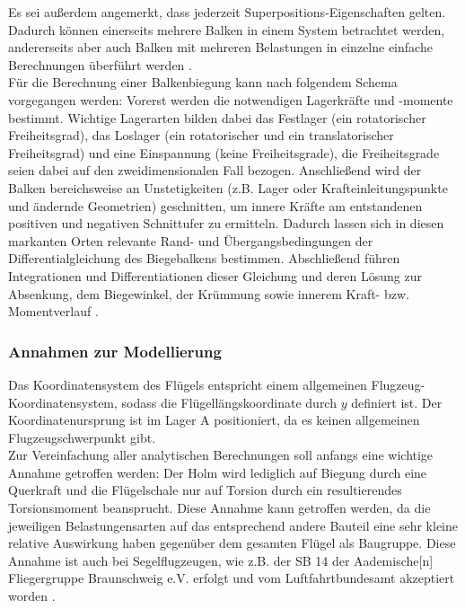 \noindent Es sei außerdem angemerkt, dass jederzeit Superpositions-Eigenschaften gelten. Dadurch können einerseits mehrere Balken in einem System betrachtet werden, andererseits aber auch Balken mit mehreren Belastungen in einzelne einfache Berechnungen überführt werden \cite{item16}.\\

\noindent Für die Berechnung einer Balkenbiegung kann nach folgendem Schema vorgegangen werden: Vorerst werden die notwendigen Lagerkräfte und -momente bestimmt. Wichtige Lagerarten bilden dabei das Festlager (ein rotatorischer Freiheitsgrad), das Loslager (ein rotatorischer und ein translatorischer Freiheitsgrad) und eine Einspannung (keine Freiheitsgrade), die Freiheitsgrade seien dabei auf den zweidimensionalen Fall bezogen. Anschließend wird der Balken bereichsweise an  Unstetigkeiten (z.B. Lager oder Krafteinleitungspunkte und ändernde Geometrien) geschnitten, um innere Kräfte am entstandenen positiven und negativen Schnittufer zu ermitteln. Dadurch lassen sich in diesen markanten Orten relevante Rand- und Übergangsbedingungen der Differentialgleichung des Biegebalkens bestimmen. Abschließend führen Integrationen und Differentiationen dieser Gleichung und deren Lösung  zur Absenkung, dem Biegewinkel, der Krümmung sowie innerem Kraft- bzw. Momentverlauf \cite{item16}\cite{item9}.


\subsubsection{Annahmen zur Modellierung}
Das Koordinatensystem des Flügels entspricht einem allgemeinen Flugzeug-Koordinatensystem, sodass die Flügellängskoordinate durch $y$ definiert ist. Der Koordinatenursprung ist im Lager A positioniert, da es keinen allgemeinen Flugzeugschwerpunkt gibt. \\

\noindent Zur Vereinfachung aller analytischen Berechnungen soll anfangs eine wichtige Annahme getroffen werden: Der Holm wird lediglich auf Biegung durch eine Querkraft und die Flügelschale nur auf Torsion durch ein resultierendes Torsionsmoment beansprucht. Diese Annahme kann getroffen werden, da die jeweiligen Belastungensarten auf das entsprechend andere Bauteil eine sehr kleine relative Auswirkung haben gegenüber dem gesamten Flügel als Baugruppe. Diese Annahme ist auch bei Segelflugzeugen, wie z.B. der SB 14 der \glqq Aademische[n] Fliegergruppe Braunschweig e.V.\grqq\: erfolgt und vom Luftfahrtbundesamt akzeptiert worden \cite{item21}.\\

